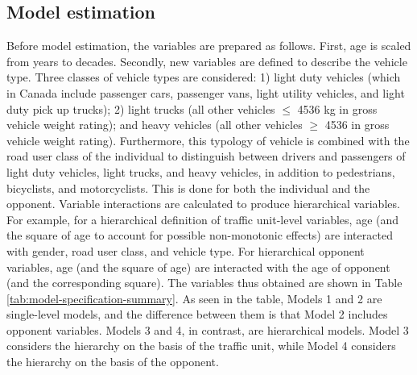 \documentclass[]{elsarticle} %
\begin{document}
\hypertarget{sec:model-estimation}{%
\subsection{Model estimation}\label{sec:model-estimation}}

Before model estimation, the variables are prepared as follows. First,
age is scaled from years to decades. Secondly, new variables are defined
to describe the vehicle type. Three classes of vehicle types are
considered: 1) light duty vehicles (which in Canada include passenger
cars, passenger vans, light utility vehicles, and light duty pick up
trucks); 2) light trucks (all other vehicles \(\le\) 4536 kg in gross
vehicle weight rating); and heavy vehicles (all other vehicles \(\ge\)
4536 in gross vehicle weight rating). Furthermore, this typology of
vehicle is combined with the road user class of the individual to
distinguish between drivers and passengers of light duty vehicles, light
trucks, and heavy vehicles, in addition to pedestrians, bicyclists, and
motorcyclists. This is done for both the individual and the opponent.
Variable interactions are calculated to produce hierarchical variables.
For example, for a hierarchical definition of traffic unit-level
variables, age (and the square of age to account for possible
non-monotonic effects) are interacted with gender, road user class, and
vehicle type. For hierarchical opponent variables, age (and the square
of age) are interacted with the age of opponent (and the corresponding
square). The variables thus obtained are shown in Table
\ref{tab:model-specification-summary}. As seen in the table, Models 1
and 2 are single-level models, and the difference between them is that
Model 2 includes opponent variables. Models 3 and 4, in contrast, are
hierarchical models. Model 3 considers the hierarchy on the basis of the
traffic unit, while Model 4 considers the hierarchy on the basis of the
opponent.
\end{document}

